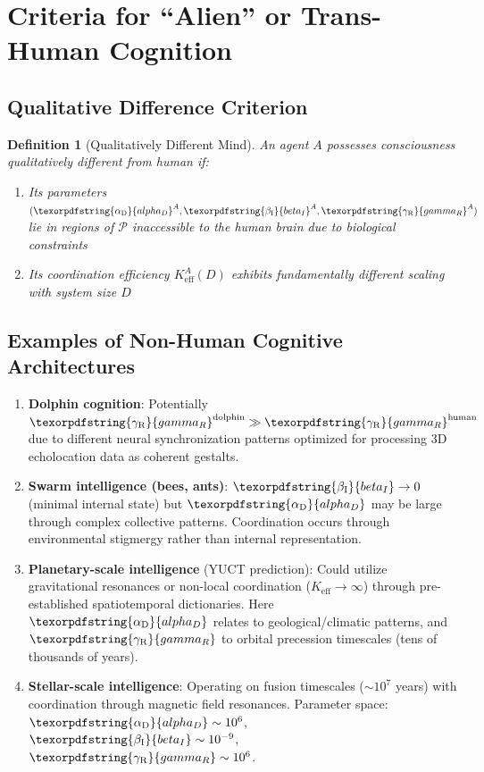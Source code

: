 \documentclass[12pt,a4paper]{article}
\newtheorem{definition}{Definition}
\DeclareRobustCommand{\alD}{\texorpdfstring{\ensuremath{\alpha_{\mathrm{D}}}}{alpha_D}}
\DeclareRobustCommand{\beI}{\texorpdfstring{\ensuremath{\beta_{\mathrm{I}}}}{beta_I}}
\DeclareRobustCommand{\gaR}{\texorpdfstring{\ensuremath{\gamma_{\mathrm{R}}}}{gamma_R}}
\newcommand{\eff}{\mathrm{eff}}
\newcommand{\Ke}{K_{\eff}}
\begin{document}
	\section{Criteria for ``Alien'' or Trans-Human Cognition}
	
	\subsection{Qualitative Difference Criterion}
	
	\begin{definition}[Qualitatively Different Mind]
		An agent \(A\) possesses consciousness qualitatively different from human if:
		\begin{enumerate}
			\item Its parameters \((\alD^A, \beI^A, \gaR^A)\) lie in regions of \(\mathcal{P}\) inaccessible to the human brain due to biological constraints
			\item Its coordination efficiency \(\Ke^A(D)\) exhibits fundamentally different scaling with system size \(D\)
		\end{enumerate}
	\end{definition}
	
	\subsection{Examples of Non-Human Cognitive Architectures}
	
	\begin{enumerate}
		\item \textbf{Dolphin cognition}: Potentially \(\gaR^{\mathrm{dolphin}} \gg \gaR^{\mathrm{human}}\) due to different neural synchronization patterns optimized for processing 3D echolocation data as coherent gestalts.
		
		\item \textbf{Swarm intelligence (bees, ants)}: \(\beI \to 0\) (minimal internal state) but \(\alD\) may be large through complex collective patterns. Coordination occurs through environmental stigmergy rather than internal representation.
		
		\item \textbf{Planetary-scale intelligence} (YUCT prediction): Could utilize gravitational resonances or non-local coordination (\(\Ke \to \infty\)) through pre-established spatiotemporal dictionaries. Here \(\alD\) relates to geological/climatic patterns, and \(\gaR\) to orbital precession timescales (tens of thousands of years).
		
		\item \textbf{Stellar-scale intelligence}: Operating on fusion timescales (\(\sim 10^7\) years) with coordination through magnetic field resonances. Parameter space: \(\alD \sim 10^6\), \(\beI \sim 10^{-9}\), \(\gaR \sim 10^6\).
	\end{enumerate}
	
\end{document}
